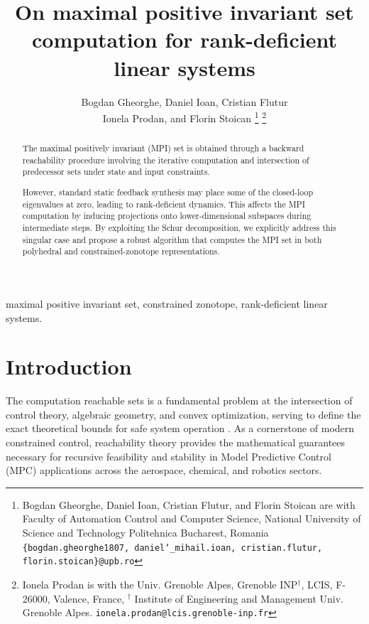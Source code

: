 \documentclass[journal,twoside,web]{ieeecolor}
\title{On maximal positive invariant set computation for rank-deficient linear systems}
\author{Bogdan Gheorghe, Daniel Ioan, Cristian Flutur\\ Ionela Prodan, and Florin Stoican
\thanks{Bogdan Gheorghe, Daniel Ioan, Cristian Flutur, and Florin Stoican are with Faculty of Automation Control and Computer Science, National University of Science and Technology Politehnica Bucharest, Romania {\tt\small \{bogdan.gheorghe1807, daniel\char`_mihail.ioan, cristian.flutur, florin.stoican\}@upb.ro}}%
\thanks{Ionela Prodan is with the Univ. Grenoble Alpes, Grenoble INP$^\dagger$, LCIS, F-26000, Valence, France, $^\dagger$ Institute of Engineering and Management Univ. Grenoble Alpes.
        {\tt\small ionela.prodan@lcis.grenoble-inp.fr}}%
}
\begin{document}
\pagestyle{empty} %
\maketitle
\thispagestyle{empty}


\begin{abstract}
The maximal positively invariant (MPI) set is obtained through a backward reachability procedure involving the iterative computation and intersection of predecessor sets under state and input constraints. 

However, standard static feedback synthesis may place some of the closed-loop eigenvalues at zero, leading to rank-deficient dynamics. This affects the MPI computation by inducing projections onto lower-dimensional subspaces during intermediate steps. By exploiting the Schur decomposition, we explicitly address this singular case and propose a robust algorithm that computes the MPI set in both polyhedral and constrained-zonotope representations.
\end{abstract}

\begin{IEEEkeywords}
maximal positive invariant set, constrained
zonotope, rank-deficient linear systems.
\end{IEEEkeywords}




\section{Introduction}
\label{sec:intro}

The computation reachable sets is a fundamental problem at the intersection of control theory, algebraic geometry, and convex optimization, serving to define the exact theoretical bounds for safe system operation \cite{ossareh_complexity_2024,marpi2024lcss}. As a cornerstone of modern constrained control, reachability theory provides the mathematical guarantees necessary for recursive feasibility\cite{chen1998quasi}  and stability in Model Predictive Control (MPC)\cite{rakovic2018handbook} applications across the aerospace, chemical, and robotics sectors. %
\end{document}

